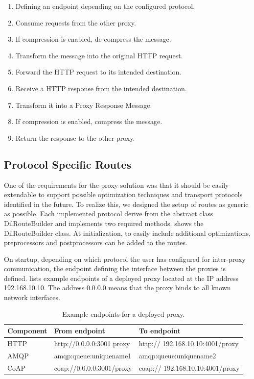\begin{enumerate}
	\item Defining an endpoint depending on the configured protocol.
	\item Consume requests from the other proxy.
	\item If compression is enabled, de-compress the message.
	\item Transform the message into the original HTTP request.
	\item Forward the HTTP request to its intended destination.
	\item Receive a HTTP response from the intended destination.
	\item Transform it into a Proxy Response Message.
	\item If compression is enabled, compress the message.
	\item Return the response to the other proxy.
\end{enumerate}

\subsection{Protocol Specific Routes}
\label{section:protocol-routes}

One of the requirements for the proxy solution was that it should be easily
extendable to support possible optimization techniques and transport protocols
identified in the future. To realize this, we designed the setup of routes as
generic as possible. Each implemented protocol derive from the abstract class
DilRouteBuilder and implements two required methods. 
shows the DilRouteBuilder class. At initialization, to easily include additional
optimizations, preprocessors and postprocessors can be added to the routes.




On startup, depending on which protocol the user has configured for inter-proxy
communication, the endpoint defining the interface between the proxies is
defined.  lists example endpoints of a deployed
proxy located at the IP address 192.168.10.10. The address 0.0.0.0 means that
the proxy binds to all known network interfaces.

\begin{table}[h]
\begin{tabularx}{\textwidth}{|l|X|X|}
\hline
\textbf{Component} & \textbf{From endpoint} & \textbf{To endpoint}       \\ \hline
HTTP               & http://0.0.0.0:3001 proxy & http:// 192.168.10.10:4001/proxy \\ \hline
AMQP               & amqp:queue:uniquename1    & amqp:queue:uniquename2          \\ \hline
CoAP               & coap://0.0.0.0:3001/proxy & coap:// 192.168.10.10:4001/proxy \\ \hline
\end{tabularx}
\caption{Example endpoints for a deployed proxy.}
\label{table:example-endpoints}
\end{table}

